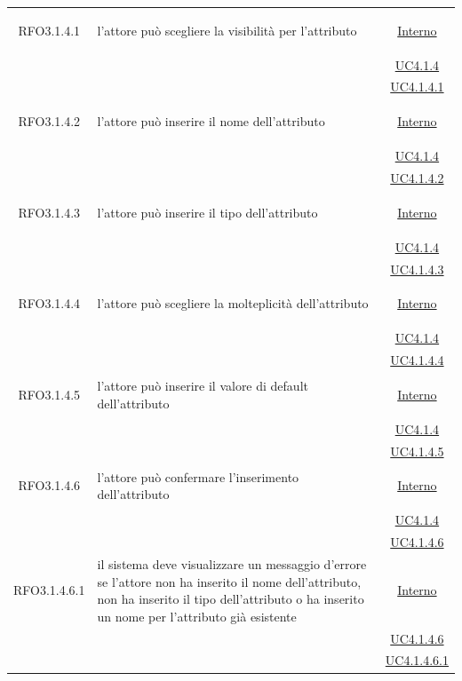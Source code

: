 \begin{itemize}
\begin{itemize}
\begin{itemize}
\begin{itemize}
\begin{longtable}{|c|>{\centering}m{7cm}|c|}
\hypertarget{RFO3.1.4.1}{RFO3.1.4.1} & l'attore può scegliere la visibilità per l'attributo &  \hyperlink{Interno}{Interno}\\
& &\hyperref[UC4.1.4]{UC4.1.4}\\
& &\hyperref[UC4.1.4.1]{UC4.1.4.1}\\ \hline

\hypertarget{RFO3.1.4.2}{RFO3.1.4.2} & l'attore può inserire il nome dell'attributo & \hyperlink{Interno}{Interno}\\
& &\hyperref[UC4.1.4]{UC4.1.4}\\
& &\hyperref[UC4.1.4.2]{UC4.1.4.2}\\ \hline

\hypertarget{RFO3.1.4.3}{RFO3.1.4.3} & l'attore può inserire il tipo dell'attributo & \hyperlink{Interno}{Interno}\\
& &\hyperref[UC4.1.4]{UC4.1.4}\\
& &\hyperref[UC4.1.4.3]{UC4.1.4.3}\\ \hline

\hypertarget{RFO3.1.4.4}{RFO3.1.4.4} & l'attore può scegliere la molteplicità dell'attributo & \hyperlink{Interno}{Interno}\\
& &\hyperref[UC4.1.4]{UC4.1.4}\\
& &\hyperref[UC4.1.4.4]{UC4.1.4.4}\\ \hline

\hypertarget{RFO3.1.4.5}{RFO3.1.4.5} & l'attore può inserire il valore di default dell'attributo & \hyperlink{Interno}{Interno}\\
& &\hyperref[UC4.1.4]{UC4.1.4}\\
& &\hyperref[UC4.1.4.5]{UC4.1.4.5}\\ \hline

\hypertarget{RFO3.1.4.6}{RFO3.1.4.6} & l'attore può confermare l'inserimento dell'attributo & \hyperlink{Interno}{Interno}\\
& &\hyperref[UC4.1.4]{UC4.1.4}\\
& &\hyperref[UC4.1.4.6]{UC4.1.4.6}\\ \hline

\hypertarget{RFO3.1.4.6.1}{RFO3.1.4.6.1} & il sistema deve visualizzare un messaggio d'errore se l'attore non ha inserito il nome dell'attributo, non ha inserito il tipo dell'attributo o ha inserito un nome per l'attributo già esistente & \hyperlink{Interno}{Interno}\\
& &\hyperref[UC4.1.4.6]{UC4.1.4.6}\\
& &\hyperref[UC4.1.4.6.1]{UC4.1.4.6.1}\\ \hline


\end{longtable}
\end{itemize}
\end{itemize}
\end{itemize}
\end{itemize}
